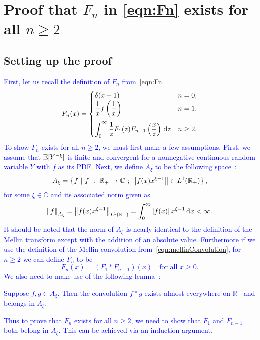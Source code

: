 \chapter{Proof that $F_n$ in \eqref{eqn:Fn} exists for all $n \geq 2$}

\section{Setting up the proof}
\textcolor{blue}{
First, let us recall the definition of $F_n$ from~\eqref{eqn:Fn}
	\begin{equation*}
		F_n(x) =
			\begin{cases}
				\ds\delta(x-1) & n = 0, \\ \vspace{0.2cm}
				\ds\fr{1}{x}f\left(\fr{1}{x}\right) & n = 1, \\
				\ds\int_0^\infty \fr{1}{z}F_1(z)F_{n-1}\left(\fr{x}{z}\right) \, \d z & n \geq 2.
			\end{cases}
	\end{equation*}
To show $F_n$ exists for all $n \geq 2$, we must first make a few assumptions. First, we assume that $\mathbb E[Y^{-\xi}]$ is finite and convergent for a nonnegative continuous random variable $Y$ with $f$ as its PDF. Next, we define $A_{\xi}$ to be the following space~\cite{kilicman2004}:
	\begin{equation*}
		A_\xi = \left\{ f \ | \ f \ : \ \mathbb{R}_{+} \rightarrow \mathbb{C} \ ; \ \norm {f(x)x^{\xi-1}} \in L^1(\mathbb{R_{+}}) \right\},
	\end{equation*}
for some $\xi \in \mathbb{C}$ and its associated norm given as
	\begin{equation*}
		\left\lVert f \right\rVert_{A_\xi} = \left\lVert f(x)x^{\xi-1}\right\rVert_{L^1(\mathbb{R}_{+})} = \int_0^\infty \left| f(x) \right|x^{\xi-1} \, \mathrm d x < \infty.
	\end{equation*}
It should be noted that the norm of $A_\xi$ is nearly identical to the definition of the Mellin transform except with the addition of an absolute value. Furthermore if we use the definition of the Mellin convolution from~\eqref{eqn:mellinConvolution}, for $n \geq 2$ we can define $F_n$ to be 
	\begin{equation}
		\label{eqn:FnConv}
		F_n(x) = (F_1 \ast F_{n-1})(x) \quad \text{for all $x \geq 0$}.
	\end{equation}
We also need to make use of the following lemma~\cite{kilicman2004}:
\begin{lemma}
\label{lem:convLemma}
Suppose $f, g \in A_\xi$. Then the convolution $f\ast g$ exists almost everywhere on $\mathbb{R_{+}}$ and belongs in $A_\xi$. 
\end{lemma}
Thus to prove that $F_n$ exists for all $n \geq 2$, we need to show that $F_1$ and $F_{n-1}$ both belong in $A_\xi$. This can be achieved via an induction argument.
}
